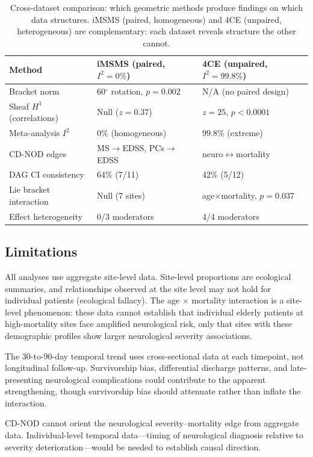 \documentclass{article}
\begin{document}
\begin{table}[t]
\centering
\caption{Cross-dataset comparison: which geometric methods produce findings on which data structures. iMSMS (paired, homogeneous) and 4CE (unpaired, heterogeneous) are complementary: each dataset reveals structure the other cannot.}
\label{tab:cross_dataset}
\begin{tabular}{lll}
\toprule
Method & iMSMS (paired, $I^2=0\%$) & 4CE (unpaired, $I^2=99.8\%$) \\
\midrule
Bracket norm & 60$^{\circ}$ rotation, $p=0.002$ & N/A (no paired design) \\
Sheaf $H^1$ (correlations) & Null ($z=0.37$) & $z=25$, $p < 0.0001$ \\
Meta-analysis $I^2$ & $0\%$ (homogeneous) & $99.8\%$ (extreme) \\
CD-NOD edges & MS$\to$EDSS, PCs$\to$EDSS & neuro$\leftrightarrow$mortality \\
DAG CI consistency & 64\% (7/11) & 42\% (5/12) \\
Lie bracket interaction & Null (7 sites) & age$\times$mortality, $p=0.037$ \\
Effect heterogeneity & 0/3 moderators & 4/4 moderators \\
\bottomrule
\end{tabular}
\end{table}

\subsection{Limitations}

All analyses use aggregate site-level data.
Site-level proportions are ecological summaries, and relationships observed at the site level may not hold for individual patients (ecological fallacy).
The age $\times$ mortality interaction is a site-level phenomenon: these data cannot establish that individual elderly patients at high-mortality sites face amplified neurological risk, only that sites with these demographic profiles show larger neurological severity associations.

The 30-to-90-day temporal trend uses cross-sectional data at each timepoint, not longitudinal follow-up.
Survivorship bias, differential discharge patterns, and late-presenting neurological complications could contribute to the apparent strengthening, though survivorship bias should attenuate rather than inflate the interaction.

CD-NOD cannot orient the neurological severity--mortality edge from aggregate data.
Individual-level temporal data---timing of neurological diagnosis relative to severity deterioration---would be needed to establish causal direction.
\end{document}
